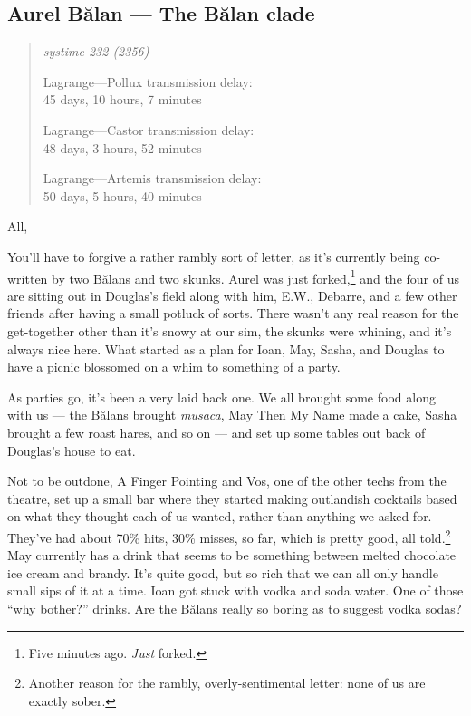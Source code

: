 \hypertarget{aurel-bux103lan-the-bux103lan-clade}{%
\subsection{Aurel Bălan — The Bălan clade}\label{aurel-bux103lan-the-bux103lan-clade}}

\begin{quote}
\itshape
systime 232 (2356)

Lagrange---Pollux transmission delay:\\
45 days, 10 hours, 7 minutes

Lagrange---Castor transmission delay:\\
48 days, 3 hours, 52 minutes

Lagrange---Artemis transmission delay:\\
50 days, 5 hours, 40 minutes
\end{quote}

All,

You'll have to forgive a rather rambly sort of letter, as it's currently being co-written by two Bălans and two skunks. Aurel was just forked,\footnote{Five minutes ago. \emph{Just} forked.} and the four of us are sitting out in Douglas's field along with him, E.W., Debarre, and a few other friends after having a small potluck of sorts. There wasn't any real reason for the get-together other than it's snowy at our sim, the skunks were whining, and it's always nice here. What started as a plan for Ioan, May, Sasha, and Douglas to have a picnic blossomed on a whim to something of a party.

As parties go, it's been a very laid back one. We all brought some food along with us — the Bălans brought \emph{musaca}, May Then My Name made a cake, Sasha brought a few roast hares, and so on — and set up some tables out back of Douglas's house to eat.

Not to be outdone, A Finger Pointing and Vos, one of the other techs from the theatre, set up a small bar where they started making outlandish cocktails based on what they thought each of us wanted, rather than anything we asked for. They've had about 70\% hits, 30\% misses, so far, which is pretty good, all told.\footnote{Another reason for the rambly, overly-sentimental letter: none of us are exactly sober.} May currently has a drink that seems to be something between melted chocolate ice cream and brandy. It's quite good, but so rich that we can all only handle small sips of it at a time. Ioan got stuck with vodka and soda water. One of those ``why bother?'' drinks. Are the Bălans really so boring as to suggest vodka sodas?

